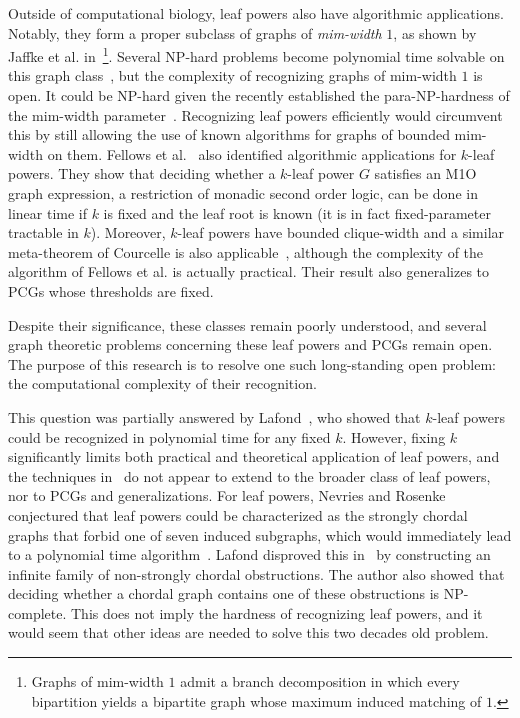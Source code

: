 \documentclass[11pt, letter]{article}
\theoremstyle{remark}
\begin{document}
Outside of computational biology, leaf powers also have algorithmic applications.  
Notably, they form a proper subclass of graphs of \emph{mim-width} $1$, as shown by Jaffke et al. in~\cite{jaffke2019mimIII}\footnote{Graphs of mim-width $1$ admit a branch decomposition in which every bipartition yields a bipartite graph whose maximum induced matching of $1$.}.  Several NP-hard problems become polynomial time solvable on this graph class~\cite{jaffke2020mimI,jaffke2020mimII}, but the complexity of recognizing graphs of mim-width $1$ is open.  It could be NP-hard given the recently established the para-NP-hardness of the mim-width parameter~\cite{bergougnoux2025mim}.  Recognizing leaf powers efficiently would circumvent this by still allowing the use of known algorithms for graphs of bounded mim-width on them.  
Fellows et al.~\cite{fellows2008leaf} also identified algorithmic applications for $k$-leaf powers. They show that deciding whether a $k$-leaf power $G$ satisfies an M1O graph expression, a restriction of monadic second order logic, can be done in linear time if $k$ is fixed and the leaf root is known (it is in fact fixed-parameter tractable in $k$).  
 Moreover, $k$-leaf powers have bounded clique-width and a similar meta-theorem of Courcelle is also applicable~\cite{courcelle2000linear}, although the complexity of the algorithm of Fellows et al. is actually practical.
Their result also generalizes to PCGs whose thresholds are fixed.  



Despite their significance, these classes remain poorly understood, and several graph theoretic problems concerning these leaf powers and PCGs remain open. The purpose of this research is to resolve one such long-standing open problem: the computational complexity of their recognition.


This question was partially answered by Lafond~\cite{Lafond2023}, who showed that $k$-leaf powers could be recognized in polynomial time for any fixed $k$.  However, fixing $k$ significantly limits both practical and theoretical application of leaf powers, and the techniques in~\cite{Lafond2023} do not appear to extend to the broader class of leaf powers, nor to PCGs and generalizations.  For leaf powers, Nevries and Rosenke conjectured that leaf powers could be characterized as the strongly chordal graphs that forbid one of seven induced subgraphs, which would immediately lead to a polynomial time algorithm~\cite{nevries2016towards}.  Lafond disproved this in~\cite{lafond2017strongly} by constructing an infinite family of non-strongly chordal obstructions.  The author also showed that deciding whether a chordal graph contains one of these obstructions is NP-complete.  This does not imply the hardness of recognizing leaf powers, and it would seem that other ideas are needed to solve this two decades old problem.
\end{document}
